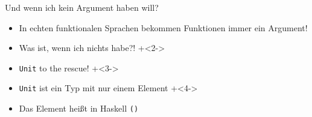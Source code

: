 %
%
%

\begin{frame}[fragile]{Und wenn ich kein Argument haben will?}
\begin{itemize}
\item In echten funktionalen Sprachen bekommen Funktionen immer ein Argument!
\item Was ist, wenn ich nichts habe?!
\onslide+<2->
\item \texttt{Unit} to the rescue!
\onslide+<3->
\item \texttt{Unit} ist ein Typ mit nur einem Element
\onslide+<4->
\item Das Element heißt in Haskell \texttt{()}
\end{itemize}
\end{frame}

